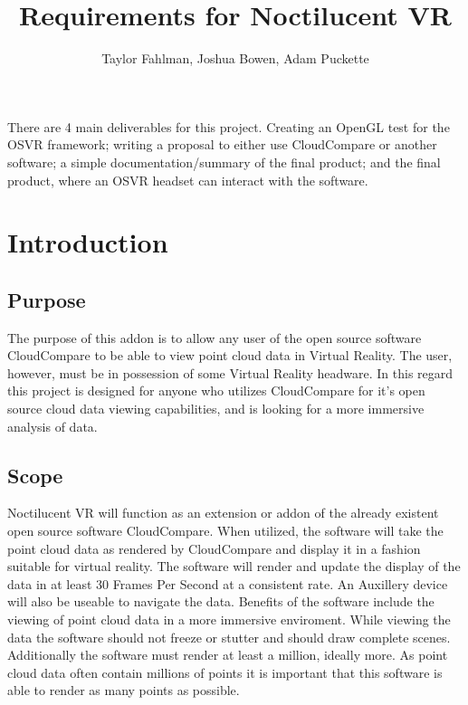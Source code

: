 \documentclass{article}
\begin{document}
\title {Requirements for Noctilucent VR}
\author {Taylor Fahlman, Joshua Bowen, Adam Puckette}

\maketitle

\abstract
There are 4 main deliverables for this project. Creating an OpenGL test for the OSVR framework;
writing a proposal to either use CloudCompare or another software; a simple documentation/summary of
the final product; and the final product, where an OSVR headset can interact with the software.

\newpage
\thispagestyle{empty}
\mbox{}

\section{Introduction}
\subsection{Purpose}

The purpose of this addon is to allow any user of the open source software CloudCompare to be able to view point cloud data in Virtual Reality.
The user, however, must be in possession of some Virtual Reality headware. 
In this regard this project is designed for anyone who utilizes CloudCompare for it's open source cloud data viewing capabilities,
and is looking for a more immersive analysis of data.

\subsection{Scope}

Noctilucent VR will function as an extension or addon of the already existent open source software CloudCompare.
When utilized, the software will take the point cloud data as rendered by CloudCompare and display it in a fashion suitable for virtual reality.
The software will render and update the display of the data in at least 30 Frames Per Second at a consistent rate.
An Auxillery device will also be useable to navigate the data.
Benefits of the software include the viewing of point cloud data in a more immersive enviroment.
While viewing the data the software should not freeze or stutter and should draw complete scenes. 
Additionally the software must render at least a million, ideally more.
As point cloud data often contain millions of points it is important that this software is able to render as many points as possible.
\end{document}

